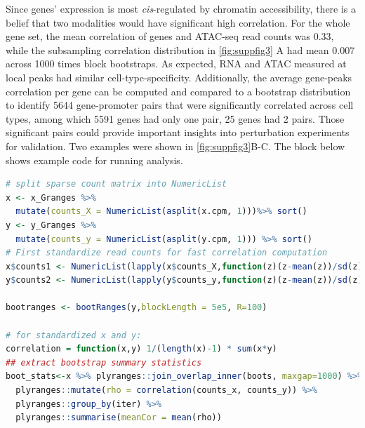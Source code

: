 \documentclass{article}
\begin{document}
Since genes' expression is most \textit{cis}-regulated by chromatin accessibility, there is a belief that two modalities would have significant high correlation. For the whole gene set, the mean correlation of genes and ATAC-seq read counts was 0.33, while the subsampling correlation distribution in \cref{fig:suppfig3} A had mean 0.007 across 1000 times block bootstraps. As expected,
RNA and ATAC measured at local peaks had similar cell-type-specificity.
Additionally, the average gene-peaks correlation per gene can be
computed and compared to a bootstrap distribution to
identify 5644 gene-promoter pairs that were significantly correlated across cell types, among which 5591 genes had only
one pair, 25 genes had 2 pairs. 
Those significant pairs could provide important insights into perturbation experiments for validation. Two examples were shown in \cref{fig:suppfig3}B-C. The block below shows example code for running analysis.
\begin{lstlisting}[language=R]
# split sparse count matrix into NumericList
x <- x_Granges %>%
  mutate(counts_X = NumericList(asplit(x.cpm, 1)))%>% sort()
y <- y_Granges %>%
  mutate(counts_y = NumericList(asplit(y.cpm, 1))) %>% sort()
# First standardize read counts for fast correlation computation
x$counts1 <- NumericList(lapply(x$counts_X,function(z)(z-mean(z))/sd(z)))
y$counts2 <- NumericList(lapply(y$counts_y,function(z)(z-mean(z))/sd(z)))

bootranges <- bootRanges(y,blockLength = 5e5, R=100)
  
# for standardized x and y:
correlation = function(x,y) 1/(length(x)-1) * sum(x*y)
## extract bootstrap summary statistics
boot_stats<-x %>% plyranges::join_overlap_inner(boots, maxgap=1000) %>%
  plyranges::mutate(rho = correlation(counts_x, counts_y)) %>%
  plyranges::group_by(iter) %>%
  plyranges::summarise(meanCor = mean(rho)) 
\end{lstlisting} 
 
\newpage
\end{document}
